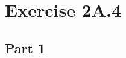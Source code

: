 \documentclass[a4paper,10pt,english]{article}
\begin{document}
\section*{Exercise 2A.4}
\subsection*{Part 1}
\end{document}

